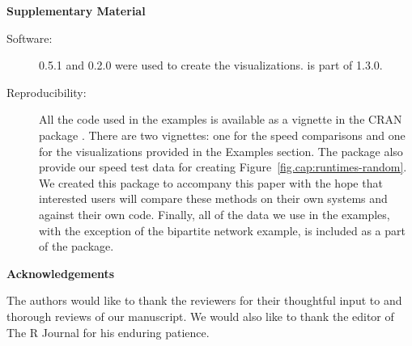 \begin{center}
{\large\bf Supplementary Material}
\end{center}

\begin{description}

\item[Software:]  0.5.1 and  0.2.0 were used to create the visualizations.  is part of  1.3.0.

\item[Reproducibility:] All the code used in the examples is available as a vignette in the CRAN package . There are two vignettes: one for the speed comparisons and one for the visualizations provided in the Examples section. The package also provide our speed test data for creating Figure~\ref{fig.cap:runtimes-random}. We created this package to accompany this paper with the hope that interested users will compare these methods on their own systems and against their own code. Finally, all of the data we use in the examples, with the exception of the bipartite network example, is included as a part of the  package. 

\end{description}

\begin{center}
{\large\bf Acknowledgements}
\end{center}

\begin{description}
\item The authors would like to thank the reviewers for their thoughtful input to and thorough reviews of our manuscript. We would also like to thank the editor of The R Journal for his enduring patience.  
\end{description}




\address{Samantha Tyner\\
  Department of Statistics and Statistical Laboratory\\
  Iowa State University\\
  United States\\}

\address{Fran\c{c}ois Briatte\\
  European School of Political Sciences\\
  Catholic University of Lille\\
  France\\}

\address{Heike Hofmann\\
  Department of Statistics and Statistical Laboratory\\
  Iowa State University\\
  United States\\}
